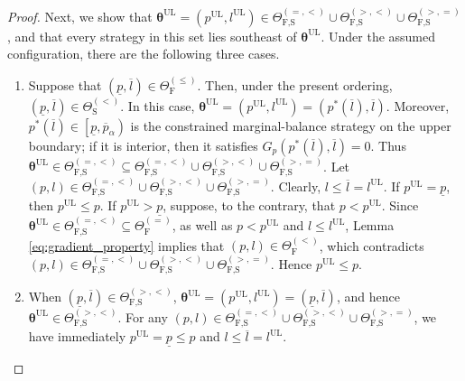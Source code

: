 \documentclass[10pt,a4paper]{amsart}
\begin{document}
\begin{proof}
Next, we show that ${\bm\theta}^{\text{UL}}=\left(p^{\text{UL}},l^{\text{UL}}\right)\in\Theta_{\text{F,S}}^{\left(=,<\right)}\cup\Theta_{\text{F,S}}^{\left(>,<\right)}\cup\Theta_{\text{F,S}}^{\left(>,=\right)}$, and that every strategy in this set lies southeast of ${\bm\theta}^{\text{UL}}$. Under the assumed configuration, there are the following three cases.
\begin{enumerate}
\item[(I)] Suppose that $\left(\underline{p},\overline{l}\right)\in\Theta_{\text{F}}^{\left(\leq\right)}$. Then, under the present ordering, $\left(\underline{p},\overline{l}\right)\in\Theta_{\text{S}}^{\left(<\right)}$. In this case, ${\bm\theta}^{\text{UL}}=\left(p^{\text{UL}},l^{\text{UL}}\right)=\left(p^*\left(\overline{l}\right),\overline{l}\right)$. Moreover, $p^*\left(\overline{l}\right)\in\left[\underline{p},\overline{p}_{\alpha}\right)$ is the constrained marginal-balance strategy on the upper boundary; if it is interior, then it satisfies $G_p\left(p^*\left(\overline{l}\right),\overline{l}\right)=0$. Thus ${\bm\theta}^{\text{UL}}\in\Theta_{\text{F,S}}^{\left(=,<\right)}\subseteq\Theta_{\text{F,S}}^{\left(=,<\right)}\cup\Theta_{\text{F,S}}^{\left(>,<\right)}\cup\Theta_{\text{F,S}}^{\left(>,=\right)}$. Let $\left(p,l\right)\in\Theta_{\text{F,S}}^{\left(=,<\right)}\cup\Theta_{\text{F,S}}^{\left(>,<\right)}\cup\Theta_{\text{F,S}}^{\left(>,=\right)}$. Clearly, $l\leq\overline{l}=l^{\text{UL}}$. If $p^{\text{UL}}=\underline{p}$, then $p^{\text{UL}}\leq p$. If $p^{\text{UL}}>\underline{p}$, suppose, to the contrary, that $p<p^{\text{UL}}$. Since ${\bm\theta}^{\text{UL}}\in\Theta_{\text{F,S}}^{\left(=,<\right)}\subseteq\Theta_{\text{F}}^{\left(=\right)}$, as well as $p<p^{\text{UL}}$ and $l\leq l^{\text{UL}}$, Lemma \ref{eq:gradient_property} implies that $\left(p,l\right)\in\Theta_{\text{F}}^{\left(<\right)}$, which contradicts $\left(p,l\right)\in\Theta_{\text{F,S}}^{\left(=,<\right)}\cup\Theta_{\text{F,S}}^{\left(>,<\right)}\cup\Theta_{\text{F,S}}^{\left(>,=\right)}$. Hence $p^{\text{UL}}\leq p$.
\item[(II)] When $\left(\underline{p},\overline{l}\right)\in\Theta_{\text{F,S}}^{\left(>,<\right)}$, ${\bm\theta}^{\text{UL}}=\left(p^{\text{UL}},l^{\text{UL}}\right)=\left(\underline{p},\overline{l}\right)$, and hence ${\bm\theta}^{\text{UL}}\in\Theta_{\text{F,S}}^{\left(>,<\right)}$. For any $\left(p,l\right)\in\Theta_{\text{F,S}}^{\left(=,<\right)}\cup\Theta_{\text{F,S}}^{\left(>,<\right)}\cup\Theta_{\text{F,S}}^{\left(>,=\right)}$, we have immediately $p^{\text{UL}}=\underline{p}\leq p$ and $l\leq\overline{l}=l^{\text{UL}}$.

\end{enumerate}
\end{proof}
\end{document}
